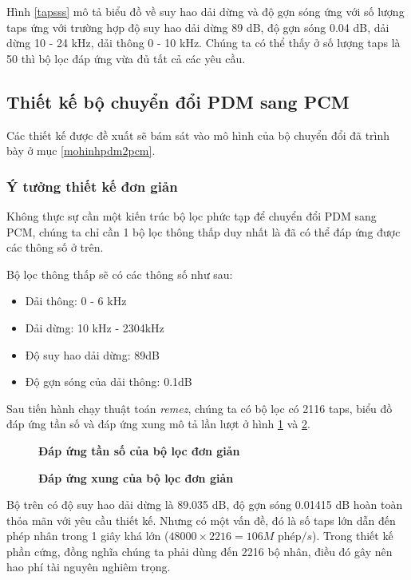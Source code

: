 Hình \ref{tapsss} mô tả biểu đồ về suy hao dải dừng và độ gợn sóng ứng với số lượng taps ứng với trường hợp độ suy hao dải dừng 89 dB, độ gợn sóng 0.04 dB, dải dừng 10 - 24 kHz, dải thông 0 - 10 kHz. Chúng ta có thể thấy ở số lượng taps là 50 thì bộ lọc đáp ứng vừa đủ tất cả các yêu cầu.
\subsection{Thiết kế bộ chuyển đổi  PDM sang PCM}
Các thiết kế được đề xuất sẽ bám sát vào mô hình của bộ chuyển đổi đã trình bày ở mục \ref{mohinhpdm2pcm}.
\subsubsection{Ý tưởng thiết kế đơn giản} \label{dongian}
Không thực sự cần một kiến trúc bộ lọc phức tạp để chuyển đổi PDM sang PCM, chúng ta chỉ cần 1 bộ lọc thông thấp duy nhất là đã có thể đáp ứng được các thông số ở trên.

Bộ lọc thông thấp sẽ có các thông số như sau: 
\begin{itemize}
    \item Dải thông: 0 - 6 kHz
    \item Dải dừng: 10 kHz - 2304kHz
    \item Độ suy hao dải dừng: 89dB
    \item Độ gợn sóng của dải thông: 0.1dB
\end{itemize}

Sau tiến hành chạy thuật toán \textit{remez}, chúng ta có bộ lọc có 2116 taps,  biểu đồ đáp ứng tần số và đáp ứng xung mô tả lần lượt ở hình \ref{filter_the_damn_thing} và \ref{filter_the_damn_thing_impulse}.
\begin{figure}[H]
    \centering
    
    \caption[Đáp ứng tần số của bộ lọc đơn giản]{\bfseries \fontsize{12pt}{0pt}\selectfont Đáp ứng tần số của bộ lọc đơn giản}
    \label{filter_the_damn_thing}
\end{figure}
\begin{figure}[H]
    \centering
    
    \caption[Đáp ứng xung của bộ lọc đơn giản]{\bfseries \fontsize{12pt}{0pt}\selectfont Đáp ứng xung của bộ lọc đơn giản}
    \label{filter_the_damn_thing_impulse}
\end{figure}

Bộ trên có độ suy hao dải dừng là 89.035 dB, độ gợn sóng 0.01415 dB hoàn toàn thỏa mãn với yêu cầu thiết kế. Nhưng có một vấn đề, đó là số taps lớn dẫn đến phép nhân trong 1 giây khá lớn ($48000 \times 2216 = 106M \text{ phép}/s$). Trong thiết kế phần cứng, đồng nghĩa chúng ta phải dùng đến 2216 bộ nhân, điều đó gây nên hao phí tài nguyên nghiêm trọng.

